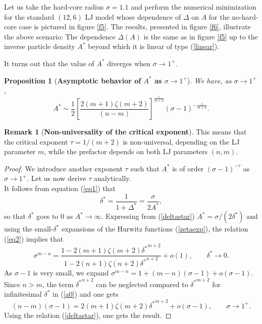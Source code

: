 \documentclass[12pt]{iopart}
\newtheorem{prop}[thm]{Proposition}
\theoremstyle{definition}
\newtheorem{remark}[thm]{Remark}
\begin{document}
Let us take the hard-core radius $\sigma=1.1$ and perform the numerical
minimization for the standard $(12,6)$ LJ model whose dependence of
$\Delta$ on $A$ for the no-hard-core case is pictured in figure \ref{f5}.
The results, presented in figure \ref{f6}, illustrate the above scenario:
The dependence $\Delta(A)$ is the same as in figure \ref{f5} up to
the inverse particle density $A^*$ beyond which it is linear of type
(\ref{linear}).

It turns out that the value of $A^*$ diverges when $\sigma\to 1^+$.
\begin{prop}[\textbf{Asymptotic behavior of $A^*$ as $\sigma\to 1^+$}]
We have, as $\sigma\to 1^+$,
\begin{equation} \label{Delta}
A^*\sim\frac{1}{2} \left[ \frac{2(m+1)\zeta(m+2)}{(n-m)}\right]^{\frac{1}{m+2}}
(\sigma-1)^{-\frac{1}{m+2}}.
\end{equation}
\end{prop}
\begin{remark}[\textbf{Non-universality of the critical exponent}]
This means that the critical exponent $\tau=1/(m+2)$ is non-universal,
depending on the LJ parameter $m$, while the prefactor depends on both LJ
parameters $(n,m)$.
\end{remark}
\begin{proof}
We introduce another exponent $\tau$ such that $A^*$ is of order
$(\sigma-1)^{-\tau}$ as $\sigma\to 1^+$.
Let us now derive $\tau$ analytically.\\
It follows from equation (\ref{eq1}) that
\begin{equation} \label{deltastar}
\delta^* = \frac{1}{1+\Delta^*} = \frac{\sigma}{2A^*} ,
\end{equation}  
so that $\delta^*$ goes to 0 as $A^*\to \infty$.
Expressing from (\ref{deltastar}) $A^*=\sigma/(2\delta^*)$ and
using the small-$\delta^*$ expansions of the Hurwitz functions
(\ref{zetaexp}), the relation (\ref{eq2}) implies that
\begin{equation} \label{a0}
\sigma^{m-n} = \frac{1-2(m+1) \zeta(m+2){\delta^*}^{m+2}}{1-2(n+1)
\zeta(n+2){\delta^*}^{n+2}} +o(1), \qquad \delta^* \to 0 .
\end{equation}
As $\sigma-1$ is very small, we expand
$\sigma^{m-n}= 1+(m-n)(\sigma-1)+o(\sigma-1)$.
Since $n>m$, the term ${\delta^*}^{n+2}$ can be neglected compared to
${\delta^*}^{m+2}$ for infinitesimal $\delta^*$ in (\ref{a0}) and one gets
\begin{equation} \label{delta}
(n-m)(\sigma-1) = 2(m+1)\zeta(m+2) {\delta^*}^{m+2}+o(\sigma-1) ,
\qquad \sigma\to 1^+ .
\end{equation}
Using the relation (\ref{deltastar}), one gets the result.
\end{proof}
\end{document}
